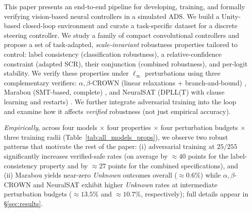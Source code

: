 This paper presents an end-to-end pipeline for developing, training, and formally verifying vision-based neural controllers in a simulated ADS. We build a Unity-based closed-loop environment and curate a task-specific dataset for a discrete steering controller. We study a family of compact convolutional controllers and propose a set of task-adapted, \emph{scale-invariant} robustness properties tailored to control: label consistency (classification robustness), a relative-confidence constraint (adapted SCR), their conjunction (combined robustness), and per-logit stability. We verify these properties under $\ell_\infty$ perturbations using three complementary verifiers: $\alpha,\beta$-CROWN (linear relaxations + branch-and-bound) \cite{zhang2018efficient,xu2021fast,wang2021beta,zhou2024scalable}, Marabou (SMT-based, complete) \cite{katz2019marabou}, and NeuralSAT (DPLL(T) with clause learning and restarts) \cite{duong2024dpllt}. We further integrate adversarial training into the loop and examine how it affects \emph{verified} robustness (not just empirical accuracy).

\noindent \emph{Empirically}, across four models $\times$ four properties $\times$ four perturbation budgets $\times$ three training radii (Table~\ref{tab:all_models_props}), we observe two robust patterns that motivate the rest of the paper: (i) adversarial training at $25/255$ significantly increases verified-safe rates (on average by $\approx\!40$ points for the label-consistency property and by $\approx\!27$ points for the combined specifications), and (ii) Marabou yields near-zero \emph{Unknown} outcomes overall ($\approx\!0.6\%$) while $\alpha,\beta$-CROWN and NeuralSAT exhibit higher \emph{Unknown} rates at intermediate perturbation budgets ($\approx\!13.5\%$ and $\approx\!10.7\%$, respectively); full details appear in \S\ref{sec:results}.


